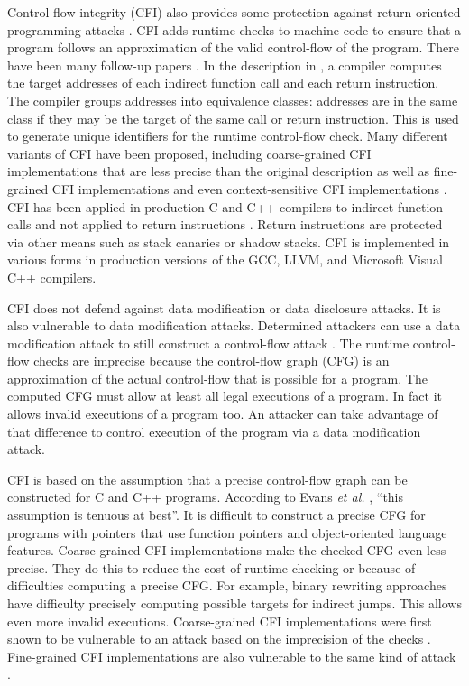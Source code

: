Control-flow integrity (CFI) also provides some protection
against return-oriented programming attacks \cite{Abadi2005}.  
CFI adds runtime checks to machine code to ensure
that a program follows an approximation of the valid control-flow of the program. 
There have been many follow-up papers \cite{Akritidis2008, Li2011, Li2010,
Mashtizadeh2015, NiuPLDI2014, NiuCCS2014, Niu2015, Sadeghi2015, Tice2014, 
vanderVeen2015, Wang2015, Wang2010, Zeng2011, ZhangSP2013,Zhang2015, ZhangSEC2013}.
In the description in \cite{Abadi2005}, a compiler computes the target addresses of each 
indirect  function call and each return instruction.  The
compiler groups addresses into equivalence classes: addresses are in the same 
class if they may be the target of the same call or return instruction.  This is
used to generate unique identifiers for the runtime control-flow check. 
Many different variants of CFI have been proposed, including coarse-grained CFI
implementations that are less precise than the original description \cite{Wang2015,
ZhangSP2013, ZhangSEC2013} 
as well as fine-grained CFI implementations \cite{Tice2014,Wang2010} 
and even context-sensitive CFI implementations \cite{vanderVeen2015}.
CFI has been applied in production C and C++ compilers to indirect function
calls and not applied to return instructions
\cite{GCCCFG2016,LLVMCFG2016,MicrosoftCFG2016, Tice2014}.   Return instructions
are protected via other means such as stack canaries or shadow stacks.  
CFI is implemented in various forms in production versions of the
GCC, LLVM, and Microsoft Visual C++ compilers.

CFI does not defend against data modification or data disclosure attacks. 
It is also vulnerable to data modification attacks.  Determined attackers can
use a data modification attack to still construct a control-flow attack
\cite{Carlini2015, Conti2015, Evans2015, Goktas2014}.
The runtime control-flow checks are imprecise because the control-flow graph (CFG)
is an approximation of the actual control-flow that is possible for
a program.  The computed CFG must allow at least all legal executions of a
program. In fact it allows invalid executions of a program too.  An
attacker can take advantage of that difference to control execution of the program
via a data modification attack.

CFI is based on the assumption that a precise control-flow graph can be
constructed for C and C++ programs.  According to Evans {\it et al.} \cite{Evans2015},
``this assumption is tenuous at best''.  It is difficult to construct
a precise CFG for programs with pointers that use function pointers and
object-oriented language features.  Coarse-grained CFI implementations make the
checked CFG even less precise.  They do this to reduce  the cost of runtime checking or 
because of difficulties computing a precise CFG.  For example, binary rewriting
approaches have difficulty precisely computing possible targets for indirect jumps.
This allows even more invalid executions.  Coarse-grained CFI implementations
were  first shown to be vulnerable to an 
attack based on the imprecision of the checks \cite{Carlini2014,Davi2014,Goktas2014}. 
Fine-grained CFI implementations are also vulnerable to the same kind of attack
\cite{Carlini2015,Evans2015}.

